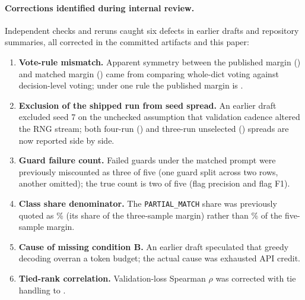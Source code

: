 \documentclass[11pt]{article}
\begin{document}
\paragraph{Corrections identified during internal review.} Independent checks and reruns caught six defects in earlier drafts and repository summaries, all corrected in the committed artifacts and this paper:
\begin{enumerate}\setlength\itemsep{1pt}\setlength\parskip{0pt}
\item \textbf{Vote-rule mismatch.} Apparent symmetry between the published margin (\pubMargin{}) and matched margin (\matMargin{}) came from comparing whole-dict voting against decision-level voting; under one rule the published margin is \pubMarginCorr{}.
\item \textbf{Exclusion of the shipped run from seed spread.} An earlier draft excluded seed 7 on the unchecked assumption that validation cadence altered the RNG stream; both four-run (\rwSD{}) and three-run unselected (\rwFreshSD{}) spreads are now reported side by side.
\item \textbf{Guard failure count.} Failed guards under the matched prompt were previously miscounted as three of five (one guard split across two rows, another omitted); the true count is two of five (flag precision and flag F1).
\item \textbf{Class share denominator.} The \texttt{PARTIAL\_MATCH} share was previously quoted as \partialShareXthree{}\% (its share of the three-sample margin) rather than \partialShare{}\% of the five-sample margin.
\item \textbf{Cause of missing condition B.} An earlier draft speculated that greedy decoding overran a token budget; the actual cause was exhausted API credit.
\item \textbf{Tied-rank correlation.} Validation-loss Spearman $\rho$ was corrected with tie handling to \ckptRho{}.
\end{enumerate}
\end{document}
